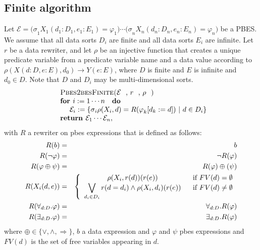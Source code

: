 \documentclass{article}
\begin{document}
\subsection{Finite algorithm}

Let $\mathcal{E=(\sigma }_{1}X_{1}(d_{1}:D_{1},e_{1}:E_{1})=\varphi
_{1})\cdots \mathcal{(\sigma }_{n}X_{n}(d_{n}:D_{n},e_{n}:E_{n})=\varphi
_{n})$ be a PBES. We assume that all data sorts $D_{i}$ are finite and all
data sorts $E_{i}$ are infinite. Let $r$ be a data rewriter, and let $\rho $
be an injective function that creates a unique predicate variable from a
predicate variable name and a data value according to $\rho
(X(d:D,e:E),d_{0})\rightarrow Y(e:E)$, where $D$ is finite and $E$ is
infinite and $d_{0}\in D$. Note that $D$ and $D_{i}$ may be
multi-dimensional sorts.%
\begin{equation*}
\begin{array}{l}
\text{\textsc{Pbes2besFinite(}}\mathcal{E}\text{, }r\text{, }\rho \text{%
\textsc{)}} \\
\text{\textbf{for }}i:=1\cdots n\text{ \textbf{do}} \\
\qquad \mathcal{E}_{i}:=\{\mathcal{\sigma }_{i}\rho (X_{i},d)=R(\varphi
_{k}[d_{k}:=d])\ |\ d\in D_{i}\} \\
\text{\textbf{return }}\mathcal{E}_{1}\cdots \mathcal{E}_{n},%
\end{array}%
\end{equation*}%
with $R$ a rewriter on pbes expressions that is defined as follows:%
\begin{eqnarray*}
R(b) &=&b \\
R(\lnot \varphi ) &=&\lnot R(\varphi ) \\
R(\varphi \oplus \psi ) &=&R(\varphi )\oplus (\psi ) \\
R(X_{i}(d,e)) &=&\left\{
\begin{array}{cc}
\rho (X_{i},r(d))(r(e)) & \text{if }FV(d)=\emptyset \\
\dbigvee\limits_{d_{i}\in D_{i}}r(d=d_{i})\wedge \rho (X_{i},d_{i})(r(e)) &
\text{if }FV(d)\neq \emptyset%
\end{array}%
\right. \\
R(\forall _{d:D}.\varphi ) &=&\forall _{d:D}.R(\varphi ) \\
R(\exists _{d:D}.\varphi ) &=&\exists _{d:D}.R(\varphi )
\end{eqnarray*}%
where $\oplus \in \{\vee ,\wedge ,\Rightarrow \}$, $b$ a data expression and
$\varphi $ and $\psi $ pbes expressions and $FV(d)$ is the set of free
variables appearing in $d$.\newpage
\end{document}
